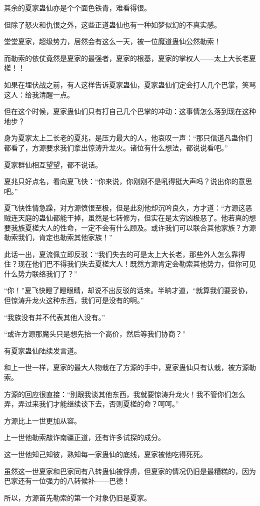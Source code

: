 \begin{this_body}
其余的夏家蛊仙亦是个个面色铁青，难看得很。

但除了怒火和仇恨之外，这些正道蛊仙也有一种如梦似幻的不真实感。

堂堂夏家，超级势力，居然会有这么一天，被一位魔道蛊仙公然勒索！

而勒索的依仗竟然是夏家的最强者，夏家的根基，夏家的掌权人——太上大长老夏槎！！

如果在埋伏战之前，有人这样告诉夏家蛊仙，夏家蛊仙们定会打人几个巴掌，笑骂这人：给我清醒一点。

但在这个时候，夏家蛊仙们只有打自己几个巴掌的冲动：这事情怎么落到现在这种地步？

身为夏家太上二长老的夏兆，是压力最大的人，他哀叹一声：“那只信道凡蛊你们都看了，方源要求我们拿出惊涛升龙火。诸位有什么想法，都说说看吧。”

夏家群仙相互望望，都不说话。

夏兆只好点名，看向夏飞快：“你来说，你刚刚不是吼得挺大声吗？说出你的意思吧。”

夏飞快性情急躁，对方源愤恨至极，但是此刻他却沉吟良久，方才道：“方源这恶贼连天庭的蛊仙都能干掉，虽然是七转修为，但实在是太穷凶极恶了。他若真的想要我族夏槎大人的性命，一定不会有什么顾及。或许我们可以联合其他家族？方源勒索我们，肯定也勒索其他家族！”

此话一出，夏流佩立即反驳：“我们失去的可是太上大长老，那些外人怎么靠得住？现在他们巴不得我们失去夏槎大人！既然方源肯定会勒索其他势力，但你可见什么势力联络我们了？”

“你！”夏飞快瞪了瞪眼睛，却说不出反驳的话来。半晌才道，“就算我们要妥协，但惊涛升龙火这种东西，我们可是没有的啊。”

“我族没有并不代表其他人没有。”

“或许方源那魔头只是想先抬一个高价，然后等我们协商？”

有夏家蛊仙陆续发言道。

和上一世一样，夏家的最大人物栽在了方源的手中，夏家蛊仙只有认栽，被方源勒索。

方源的回应很直接：“别跟我谈其他东西，我就要惊涛升龙火！我不管你们怎么弄，弄过来我们才能继续谈下去，否则夏槎的命？呵呵。”

方源比上一世更加从容。

上一世他勒索敲诈南疆正道，还有许多试探的成分。

这一世他知己知彼，熟知每一家蛊仙的底线，夏家被他吃得死死。

虽然这一世夏家和巴家同有八转蛊仙被俘虏，但夏家的情况仍旧是最糟糕的，因为巴家还有一位强力的八转候补——巴德！

所以，方源首先勒索的第一个对象仍旧是夏家。


\end{this_body}
